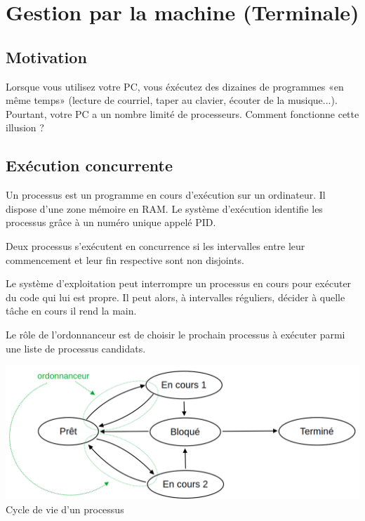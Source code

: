 
\section{Gestion par la machine (Terminale)}

\subsection{Motivation}

Lorsque vous utilisez votre PC, vous éxécutez des dizaines de programmes «en même temps» (lecture de courriel, taper au clavier, écouter de la musique...). Pourtant, votre PC a un nombre limité de processeurs. Comment fonctionne cette illusion ?

\subsection{Exécution concurrente}

\begin{definition}
	Un processus est un programme en cours d'exécution sur un ordinateur. Il dispose d'une zone mémoire en RAM. Le système d'exécution identifie les processus grâce à un numéro unique appelé PID.
\end{definition}

\begin{definition}
	Deux processus s'exécutent en concurrence si les intervalles entre leur commencement et leur fin respective sont non disjoints.
\end{definition}

\begin{principe}
	Le système d'exploitation peut interrompre un processus en cours pour exécuter du code qui lui est propre. Il peut alors, à intervalles réguliers, décider à quelle tâche en cours il rend la main. 
	
	Le rôle de l'ordonnanceur est de choisir le prochain processus à exécuter parmi une liste de processus candidats. 
\end{principe}

\begin{center}
	\includegraphics[width=0.9\linewidth]{lecon/17-ordonnancement/graphe_etat.png}\\
	Cycle de vie d'un processus
\end{center}

